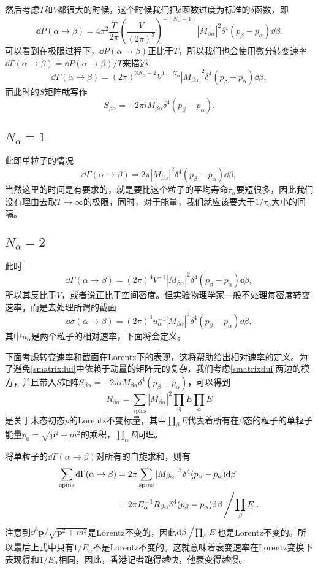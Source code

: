 然后考虑$T$和$V$都很大的时候，这个时候我们把$\delta$函数过度为标准的$\delta$函数，即
\[
	\dd P(\alpha\to\beta)=4\pi^2\frac{T}{2\pi}\left(\frac{V}{(2\pi)^3}\right)^{-(N_\alpha-1)}\left|M_{\beta\alpha}\right|^2\delta^4(p_\beta-p_\alpha)\dd \beta.
\]
可以看到在极限过程下，$\dd P(\alpha\to\beta)$正比于$T$，所以我们也会使用微分转变速率$\dd \Gamma(\alpha\to\beta)=\dd P(\alpha\to\beta)/T$来描述
\[
	\dd \Gamma (\alpha\to\beta)=(2\pi)^{3N_\alpha-2}V^{1-N_\alpha}\left|M_{\beta\alpha}\right|^2\delta^4(p_\beta-p_\alpha)\dd \beta,
\]
而此时的$S$矩阵就写作
\[
S_{\beta\alpha}=-2\pi iM_{\beta\alpha}\delta^4(p_\beta-p_\alpha).
\]
\subsection*{$N_\alpha=1$}
此即单粒子的情况
\[
	\dd \Gamma (\alpha\to\beta)=2\pi\left|M_{\beta\alpha}\right|^2\delta^4(p_\beta-p_\alpha)\dd \beta,
\]
当然这里的时间是有要求的，就是要比这个粒子的平均寿命$\tau_\alpha$要短很多，因此我们没有理由去取$T\to \infty$的极限，同时，对于能量，我们就应该要大于$1/\tau_\alpha$大小的间隔。
\subsection*{$N_\alpha=2$}
此时
\[
	\dd \Gamma (\alpha\to\beta)=(2\pi)^{4}V^{-1}\left|M_{\beta\alpha}\right|^2\delta^4(p_\beta-p_\alpha)\dd \beta,
\]
所以其反比于$V$，或者说正比于空间密度。但实验物理学家一般不处理每密度转变速率，而是去处理所谓的截面
\[
	\dd \sigma (\alpha\to\beta)=(2\pi)^{4}u_\alpha^{-1}\left|M_{\beta\alpha}\right|^2\delta^4(p_\beta-p_\alpha)\dd \beta,
\]
其中$u_\alpha$是两个粒子的相对速率，下面将会定义。

下面考虑转变速率和截面在Lorentz下的表现，这将帮助给出相对速率的定义。为了避免\eqref{smatrixdui}中依赖于动量的矩阵元的复杂，我们考虑\eqref{smatrixdui}两边的模方，并且带入$S$矩阵$S_{\beta\alpha}=-2\pi iM_{\beta\alpha}\delta^4(p_\beta-p_\alpha)$，可以得到
\[
	R_{\beta\alpha}=\sum_{\text{spins}}|M_{\beta\alpha}|^2\prod_\beta E\prod_\alpha E
\]
是关于末态初态$p$的Lorentz不变标量，其中$\prod_\beta E$代表着所有在$\beta$态的粒子的单粒子能量$p_0=\sqrt{\bm{p}^2+m^2}$的乘积，$\prod_\alpha E$同理。

将单粒子的$\dd \Gamma (\alpha\to\beta)$对所有的自旋求和，则有
\[
	\begin{split}
	\sum_{\text{spins}}\mathrm{d} \Gamma (\alpha\to\beta)&=
	2\pi\sum_{\text{spins}}\left|M_{\beta\alpha}\right|^2\delta^4(p_\beta-p_\alpha)\mathrm{d} \beta\\
	&=2\pi E^{-1}_\alpha R_{\beta\alpha}\delta^4(p_\beta-p_\alpha)\mathrm{d} \beta\left/\prod_\beta E\right..
	\end{split}
\]
注意到$\dd^3 \bm{p}/\sqrt{\bm{p}^2+m^2}$是Lorentz不变的，因此$\mathrm{d} \beta\left/\prod_\beta E\right.$也是Lorentz不变的。所以最后上式中只有$1/E_\alpha$不是Lorentz不变的。这就意味着衰变速率在Lorentz变换下表现得和$1/E_\alpha$相同，因此，香港记者跑得越快，他衰变得越慢。

